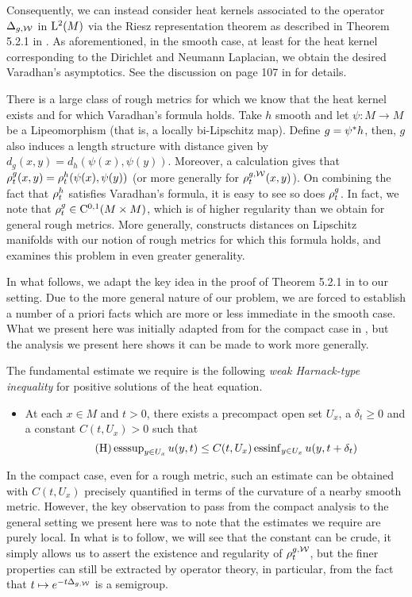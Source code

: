 \documentclass[a4paper, 12pt]{amsart}
\begin{document}
Consequently, we can instead consider heat kernels
associated to the operator $\Delta_{g,\mathcal{W}}$ in ${\rm L}^{2}_{\rm {}}(M)$
via the Riesz representation theorem as described in Theorem 
5.2.1 in \cite{Davies}. As aforementioned, in the smooth case,
at least for the heat kernel corresponding to the 
Dirichlet and Neumann Laplacian, we obtain the desired  Varadhan's
asymptotics. See the discussion on page 107 in \cite{ERS} for details.

There is a large class of rough metrics
for which we know that the heat kernel exists
and for which Varadhan's formula holds. 
Take $h$ smooth and let $\psi:M \to M$
be a Lipeomorphism (that is, a locally bi-Lipschitz map).
Define $g = {\psi}^\ast h$, then, $g$ 
also induces a length structure with 
distance given by $d_g(x,y) = d_h(\psi(x), \psi(y))$.
Moreover, a calculation gives
that $\rho^{g}_t(x,y) = \rho^{h}_t(\psi(x), \psi(y))$
(or more generally for $\rho^{g,\mathcal{W}}_t(x,y)$). 
On combining the fact that $\rho^h_t$ satisfies
Varadhan's formula, it is easy to see
so does $\rho^{g}_t$. In fact, we 
note that $\rho^g_t \in {\rm C}^{0,1}_{\rm {}}(M \times M)$,
which is of higher regularity than we
obtain for general rough metrics.
More generally, \cite{Norris} constructs
distances on Lipschitz manifolds with our
notion of rough metrics for which this 
formula holds, and \cite{ERS} examines
this problem in even greater generality.

In what follows, we adapt the key idea in 
the proof of Theorem 5.2.1 in \cite{Davies}
to our setting. Due to the more general 
nature of our problem, we are forced to 
establish a number of a priori facts which 
are more or less immediate in the smooth case.
What we present here was initially adapted from \cite{SC} 
for the compact case in \cite{BCont}, but 
the analysis we present here shows it can be made to work more generally. 

The fundamental estimate we
require is the following \emph{weak Harnack-type inequality} for positive solutions of the heat
equation.
\begin{itemize}
\item[] At each $x \in M$ and $t > 0$, there exists a precompact
open set $U_x$, a $\delta_t \geq 0$ and a constant $C(t, U_x)  > 0$ such that
\begin{equation}
\tag{H}
\label{eq:Harnack}
\operatorname{esssup}_{y \in U_x} u(y,t)
	\leq C(t, U_x)  \operatorname{essinf}_{y \in U_x} u(y, t + \delta_t)
\end{equation}
\end{itemize}

In the compact case, even for a
rough metric, such an estimate can be
obtained with $C(t,U_x)$ precisely quantified
in terms of the curvature of a nearby smooth metric.
However, the key observation to pass from the compact analysis
to the general setting we present here was to note that
the estimates we require are purely local. In 
what is to follow, we will see that the constant can be
crude, it simply allows us to assert the existence and regularity
of $\rho^{g,\mathcal{W}}_t$, but the finer properties can still 
be extracted by operator theory, in particular, from the 
fact that $t \mapsto e^{-t\Delta_{g,\mathcal{W}}}$ is a semigroup.
\end{document}
